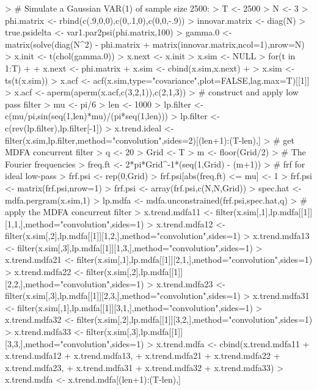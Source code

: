 \documentclass[a4paper]{book}
\begin{document}
\begin{Schunk}
\begin{Sinput}
> # Simulate a Gaussian VAR(1) of sample size 2500:
> T <- 2500
> N <- 3
> phi.matrix <- rbind(c(.9,0,0),c(0,.1,0),c(0,0,-.9))
> innovar.matrix <- diag(N)
> true.psidelta <- var1.par2psi(phi.matrix,100)
> gamma.0 <- matrix(solve(diag(N^2) - phi.matrix %
+ 	matrix(innovar.matrix,ncol=1),nrow=N)
> x.init <- t(chol(gamma.0)) %
> x.next <- x.init
> x.sim <- NULL
> for(t in 1:T)
+ {
+ 	x.next <- phi.matrix %
+ 	x.sim <- cbind(x.sim,x.next)
+ }
> x.sim <- ts(t(x.sim))
> x.acf <- acf(x.sim,type="covariance",plot=FALSE,lag.max=T)[[1]]
> x.acf <- aperm(aperm(x.acf,c(3,2,1)),c(2,1,3))
> # construct and apply low pass filter
> mu <- pi/6
> len <- 1000
> lp.filter <- c(mu/pi,sin(seq(1,len)*mu)/(pi*seq(1,len)))
> lp.filter <- c(rev(lp.filter),lp.filter[-1])
> x.trend.ideal <- filter(x.sim,lp.filter,method="convolution",sides=2)[(len+1):(T-len),]
> # get MDFA concurrent filter
> q <- 20
> Grid <- T
> m <- floor(Grid/2)
> # The Fourier frequencies
> freq.ft <- 2*pi*Grid^{-1}*(seq(1,Grid) - (m+1))
> # frf for ideal low-pass
> frf.psi <- rep(0,Grid)
> frf.psi[abs(freq.ft) <= mu] <- 1
> frf.psi <- matrix(frf.psi,nrow=1) %
> frf.psi <- array(frf.psi,c(N,N,Grid))
> spec.hat <- mdfa.pergram(x.sim,1)	
> lp.mdfa <- mdfa.unconstrained(frf.psi,spec.hat,q)
> # apply the MDFA concurrent filter
> x.trend.mdfa11 <- filter(x.sim[,1],lp.mdfa[[1]][1,1,],method="convolution",sides=1)
> x.trend.mdfa12 <- filter(x.sim[,2],lp.mdfa[[1]][1,2,],method="convolution",sides=1)
> x.trend.mdfa13 <- filter(x.sim[,3],lp.mdfa[[1]][1,3,],method="convolution",sides=1)
> x.trend.mdfa21 <- filter(x.sim[,1],lp.mdfa[[1]][2,1,],method="convolution",sides=1)
> x.trend.mdfa22 <- filter(x.sim[,2],lp.mdfa[[1]][2,2,],method="convolution",sides=1)
> x.trend.mdfa23 <- filter(x.sim[,3],lp.mdfa[[1]][2,3,],method="convolution",sides=1)
> x.trend.mdfa31 <- filter(x.sim[,1],lp.mdfa[[1]][3,1,],method="convolution",sides=1)
> x.trend.mdfa32 <- filter(x.sim[,2],lp.mdfa[[1]][3,2,],method="convolution",sides=1)
> x.trend.mdfa33 <- filter(x.sim[,3],lp.mdfa[[1]][3,3,],method="convolution",sides=1)
> x.trend.mdfa <- cbind(x.trend.mdfa11 + x.trend.mdfa12 + x.trend.mdfa13,
+ 	x.trend.mdfa21 + x.trend.mdfa22 + x.trend.mdfa23,
+ 	x.trend.mdfa31 + x.trend.mdfa32 + x.trend.mdfa33)
> x.trend.mdfa <- x.trend.mdfa[(len+1):(T-len),] 
\end{Sinput}
\end{Schunk}
\end{document}
